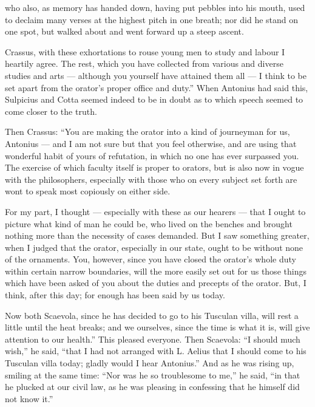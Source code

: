  who also, as memory has handed down, having put pebbles into his mouth, used to declaim many verses at the highest pitch in one breath; nor did he stand on one spot, but walked about and went forward up a steep ascent.

 Crassus, with these exhortations to rouse young men to study and labour I heartily agree. The rest, which you have collected from various and diverse studies and arts — although you yourself have attained them all — I think to be set apart from the orator's proper office and duty.'' When Antonius had said this, Sulpicius and Cotta seemed indeed to be in doubt as to which speech seemed to come closer to the truth.

 Then Crassus: ``You are making the orator into a kind of journeyman for us, Antonius — and I am not sure but that you feel otherwise, and are using that wonderful habit of yours of refutation, in which no one has ever surpassed you. The exercise of which faculty itself is proper to orators, but is also now in vogue with the philosophers, especially with those who on every subject set forth are wont to speak most copiously on either side.

 For my part, I thought — especially with these as our hearers — that I ought to picture what kind of man he could be, who lived on the benches and brought nothing more than the necessity of cases demanded. But I saw something greater, when I judged that the orator, especially in our state, ought to be without none of the ornaments. You, however, since you have closed the orator's whole duty within certain narrow boundaries, will the more easily set out for us those things which have been asked of you about the duties and precepts of the orator. But, I think, after this day; for enough has been said by us today.

 Now both Scaevola, since he has decided to go to his Tusculan villa, will rest a little until the heat breaks; and we ourselves, since the time is what it is, will give attention to our health.'' This pleased everyone. Then Scaevola: ``I should much wish,'' he said, ``that I had not arranged with L. Aelius that I should come to his Tusculan villa today; gladly would I hear Antonius.'' And as he was rising up, smiling at the same time: ``Nor was he so troublesome to me,'' he said, ``in that he plucked at our civil law, as he was pleasing in confessing that he himself did not know it.''


